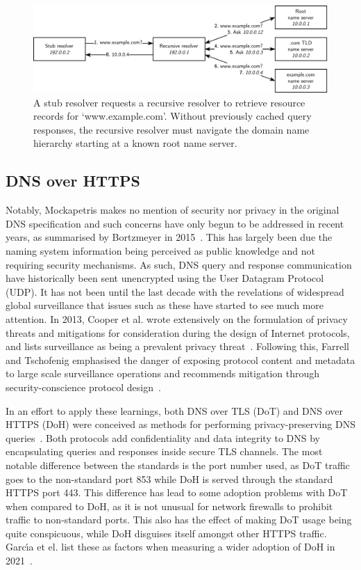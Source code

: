 \begin{figure}[ht]
\centerline{\includegraphics[width=160mm]{images/dns-resolve.png}}
\caption[Example DNS name resolution process]{A stub resolver requests a recursive resolver to retrieve resource records for `www.example.com'. Without previously cached query responses, the recursive resolver must navigate the domain name hierarchy starting at a known root name server.}
\label{dns_resolve_figure}
\end{figure}

\subsection{DNS over HTTPS}

Notably, Mockapetris makes no mention of security nor privacy in the original DNS specification and such concerns have only begun to be addressed in recent years, as summarised by Bortzmeyer in 2015~\cite{rfc7626}. This has largely been due the naming system information being perceived as public knowledge and not requiring security mechanisms. As such, DNS query and response communication have historically been sent unencrypted using the User Datagram Protocol (UDP). It has not been until the last decade with the revelations of widespread global surveillance that issues such as these have started to see much more attention. In 2013, Cooper et al. wrote extensively on the formulation of privacy threats and mitigations for consideration during the design of Internet protocols, and lists surveillance as being a prevalent privacy threat~\cite{rfc6973}. Following this, Farrell and Tschofenig emphasised the danger of exposing protocol content and metadata to large scale surveillance operations and recommends mitigation through security-conscience protocol design~\cite{rfc7258}.

In an effort to apply these learnings, both DNS over TLS (DoT) and DNS over HTTPS (DoH) were conceived as methods for performing privacy-preserving DNS queries~\cite{rfc7858, rfc8484}. Both protocols add confidentiality and data integrity to DNS by encapsulating queries and responses inside secure TLS channels. The most notable difference between the standards is the port number used, as DoT traffic goes to the non-standard port 853 while DoH is served through the standard HTTPS port 443. This difference has lead to some adoption problems with DoT when compared to DoH, as it is not unusual for network firewalls to prohibit traffic to non-standard ports. This also has the effect of making DoT usage being quite conspicuous, while DoH disguises itself amongst other HTTPS traffic. Garc{\'\i}a et el. list these as factors when measuring a wider adoption of DoH in 2021~\cite{garcia2021large}.

